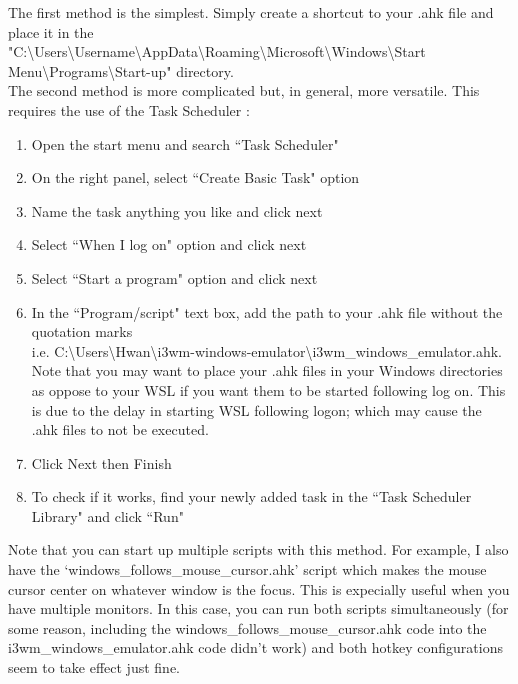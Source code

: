 The first method is the simplest. Simply create a shortcut to your .ahk file
and place it in the\\
"C:\textbackslash Users\textbackslash Username\textbackslash AppData\textbackslash Roaming\textbackslash Microsoft\textbackslash Windows\textbackslash Start Menu\textbackslash Programs\textbackslash Start-up" directory.\\

The second method is more complicated but, in general, more versatile. This
requires the use of the Task Scheduler \cite{bashkarla2016how}:
\begin{enumerate}
    \item Open the start menu and search ``Task Scheduler"
    \item On the right panel, select ``Create Basic Task" option
    \item Name the task anything you like and click next
    \item Select ``When I log on" option and click next
    \item Select ``Start a program" option and click next
    \item In the ``Program/script" text box, add the path to your .ahk file
        without the quotation marks\\
        i.e. C:\textbackslash Users\textbackslash Hwan\textbackslash i3wm-windows-emulator\textbackslash i3wm\_windows\_emulator.ahk.\\
        Note that you may want to place your .ahk files in your Windows
        directories as oppose to your WSL if you want them to be started
        following log on. This is due to the delay in starting WSL following
        logon; which may cause the .ahk files to not be executed.
    \item Click Next then Finish
    \item To check if it works, find your newly added task in the ``Task Scheduler Library" and
       click ``Run"
\end{enumerate}
Note that you can start up multiple scripts with this method. For example, I
also have the `windows\_follows\_mouse\_cursor.ahk' script which makes the mouse
cursor center on whatever window is the focus. This is expecially useful when
you have multiple monitors. In this case, you can run both scripts
simultaneously (for some reason, including the
windows\_follows\_mouse\_cursor.ahk code into the i3wm\_windows\_emulator.ahk
code didn't work) and both hotkey configurations seem to take effect just fine.

